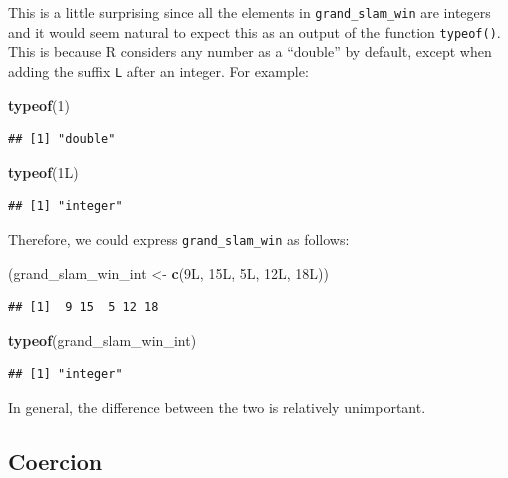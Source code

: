 \documentclass[12pt,]{krantz}
\newenvironment{Shaded}{\begin{snugshade}}{\end{snugshade}}
\newcommand{\KeywordTok}[1]{\textcolor[rgb]{0.27,0.27,0.27}{\textbf{#1}}}
\newcommand{\DecValTok}[1]{\textcolor[rgb]{0.06,0.06,0.06}{#1}}
\newcommand{\StringTok}[1]{\textcolor[rgb]{0.5,0.5,0.5}{#1}}
\newcommand{\NormalTok}[1]{#1}
\begin{document}
This is a little surprising since all the elements in
\texttt{grand\_slam\_win} are integers and it would seem natural to
expect this as an output of the function \texttt{typeof()}. This is
because R considers any number as a ``double'' by default, except when
adding the suffix \texttt{L} after an integer. For example:

\begin{Shaded}
\begin{Highlighting}[]
\KeywordTok{typeof}\NormalTok{(}\DecValTok{1}\NormalTok{)}
\end{Highlighting}
\end{Shaded}

\begin{verbatim}
## [1] "double"
\end{verbatim}

\begin{Shaded}
\begin{Highlighting}[]
\KeywordTok{typeof}\NormalTok{(1L)}
\end{Highlighting}
\end{Shaded}

\begin{verbatim}
## [1] "integer"
\end{verbatim}

Therefore, we could express \texttt{grand\_slam\_win} as follows:

\begin{Shaded}
\begin{Highlighting}[]
\NormalTok{(grand_slam_win_int <-}\StringTok{ }\KeywordTok{c}\NormalTok{(9L, 15L, 5L, 12L, 18L))}
\end{Highlighting}
\end{Shaded}

\begin{verbatim}
## [1]  9 15  5 12 18
\end{verbatim}

\begin{Shaded}
\begin{Highlighting}[]
\KeywordTok{typeof}\NormalTok{(grand_slam_win_int)}
\end{Highlighting}
\end{Shaded}

\begin{verbatim}
## [1] "integer"
\end{verbatim}

In general, the difference between the two is relatively unimportant.

\subsection{Coercion}\label{coercion}
\end{document}
